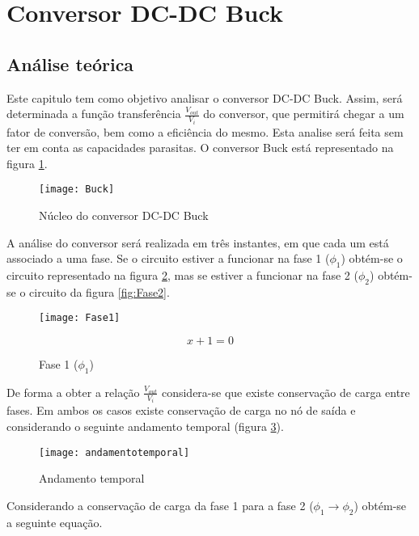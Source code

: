 \documentclass[../Main.tex]{article}
\begin{document}
\section{Conversor DC-DC Buck}
\subsection{Análise teórica}
Este capitulo tem como objetivo analisar o conversor DC-DC Buck. Assim, será determinada a função transferência $\frac{V_{out}}{V_i}$ do conversor, que permitirá chegar a um fator de conversão, bem como a eficiência do mesmo. Esta analise será feita sem ter em conta as capacidades parasitas.
O conversor Buck está representado na figura  \ref{fig:Nucleo_do_conversor_DC-DC_Buck}.
\begin{figure}[htbp]
	\centering
	\texttt{[image: Buck]}
	\caption{Núcleo do conversor DC-DC Buck}
	\label{fig:Nucleo_do_conversor_DC-DC_Buck}
\end{figure}

A análise do conversor será realizada em três instantes, em que cada um está associado a uma fase. Se o circuito estiver a funcionar na fase 1 ($\phi_1$) obtém-se o circuito representado na figura \ref{fig:Fase1}, mas se estiver a funcionar na fase 2 ($\phi_2$) obtém-se o circuito da figura \ref{fig:Fase2}.
	
\begin{figure}[htbp]
\centering
\begin{minipage}{.5\textwidth}
	\centering
	\texttt{[image: Fase1]}
	\caption{Fase 1 ($\phi_1$)}
	\label{fig:Fase1}
\end{minipage}%
\begin{minipage}{.5\textwidth}
	\centering
	\begin{equation}
		x+1=0
	\end{equation}					
\end{minipage}
\end{figure}

De forma a obter a relação $\frac{V_{out}}{V_i}$ considera-se que existe conservação de carga entre fases. Em ambos os casos existe conservação de carga no nó de saída e considerando o seguinte andamento temporal (figura \ref{fig:Andamento temporal}).

\begin{figure}[h]
	\centering
	\texttt{[image: andamentotemporal]}
	\caption{Andamento temporal}
	\label{fig:Andamento temporal}
\end{figure}
Considerando a conservação de carga da fase 1 para a fase 2 ($\phi_1 \rightarrow \phi_2$) obtém-se a seguinte equação.
\vspace{5mm}
\end{document}
